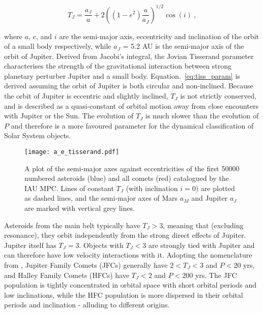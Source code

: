 \vspace{-2ex}
\begin{equation}
    T_J = \dfrac{a_J}{a} + 2\left( {(1-e^2)\dfrac{a}{a_J}} \right)^{1/2} \cos(i)~,
\label{eq:tiss_param}
\end{equation}

where $a$, $e$, and $i$ are the semi-major axis, eccentricity and inclination of the orbit of a small body respectively, while $a_J$ = 5.2 AU is the semi-major axis of the orbit of Jupiter. Derived from Jacobi's integral, the Jovian Tisserand parameter characterises the strength of the gravitational interaction between strong planetary perturber Jupiter and a small body. Equation.~\eqref{eq:tiss_param} is derived assuming the orbit of Jupiter is both circular and non-inclined. Because the orbit of Jupiter is eccentric and slightly inclined, $T_J$ is not strictly conserved, and is described as a quasi-constant of orbital motion away from close encounters with Jupiter or the Sun. The evolution of $T_J$ is much slower than the evolution of $P$ and therefore is a more favoured parameter for the dynamical classification of Solar System objects. 

\begin{figure}[t!]
    \centering
    \vspace{-3ex}
    \texttt{[image: a\_e\_tisserand.pdf]}
    \caption[Tisserand parameter plot for known asteroids and comets]{A plot of the semi-major axes against eccentricities of the first 50000 numbered asteroids (blue) and all comets (red) catalogued by the IAU MPC. Lines of constant $T_J$ (with inclination $i=0$) are plotted as dashed lines, and the semi-major axes of Mars $a_M$ and Jupiter $a_J$ are marked with vertical grey lines.}
    \label{fig:tiss_param}
\end{figure}

Asteroids from the main belt typically have $T_J > 3$, meaning that (excluding resonance), they orbit independently from the strong direct effects of Jupiter. Jupiter itself has  $T_J = 3$. Objects with  $T_J < 3$ are strongly tied with Jupiter and can therefore have low velocity interactions with it. Adopting the nomenclature from \citep{1987PAICz..67...21C}, Jupiter Family Comets (JFCs) generally have $2 < T_J < 3$ and $P < 20$ yrs, and Halley Family Comets (HFCs) have $T_J < 2$ and $P < 200$ yrs. The JFC population is tightly concentrated in orbital space with short orbital periods and low inclinations, while the HFC population is more dispersed in their orbital periods and inclination - alluding to different origins.

